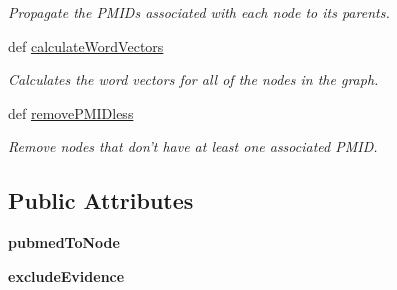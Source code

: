 \begin{DoxyCompactItemize}
\begin{DoxyCompactList}\small\item\em Propagate the P\-M\-I\-Ds associated with each node to its parents. \end{DoxyCompactList}\item 
def \hyperlink{classgographer_1_1_g_o_pubmed_graph_1_1_g_o_pubmed_graph_aebb4c16c82e92debadf145153f0c519a}{calculate\-Word\-Vectors}
\begin{DoxyCompactList}\small\item\em Calculates the word vectors for all of the nodes in the graph. \end{DoxyCompactList}\item 
\hypertarget{classgographer_1_1_g_o_pubmed_graph_1_1_g_o_pubmed_graph_afec207ccd7c52eecce6d972aa4398ba0}{def \hyperlink{classgographer_1_1_g_o_pubmed_graph_1_1_g_o_pubmed_graph_afec207ccd7c52eecce6d972aa4398ba0}{remove\-P\-M\-I\-Dless}}\label{classgographer_1_1_g_o_pubmed_graph_1_1_g_o_pubmed_graph_afec207ccd7c52eecce6d972aa4398ba0}

\begin{DoxyCompactList}\small\item\em Remove nodes that don't have at least one associated P\-M\-I\-D. \end{DoxyCompactList}\end{DoxyCompactItemize}
\subsection*{Public Attributes}
\begin{DoxyCompactItemize}
\item 
\hypertarget{classgographer_1_1_g_o_pubmed_graph_1_1_g_o_pubmed_graph_a6dde52b3e51a9c0cfb42c9748cc97594}{{\bfseries pubmed\-To\-Node}}\label{classgographer_1_1_g_o_pubmed_graph_1_1_g_o_pubmed_graph_a6dde52b3e51a9c0cfb42c9748cc97594}

\item 
\hypertarget{classgographer_1_1_g_o_pubmed_graph_1_1_g_o_pubmed_graph_aa537adde73c93b4e611bb2b2f4a7d17b}{{\bfseries exclude\-Evidence}}\label{classgographer_1_1_g_o_pubmed_graph_1_1_g_o_pubmed_graph_aa537adde73c93b4e611bb2b2f4a7d17b}

\end{DoxyCompactItemize}



